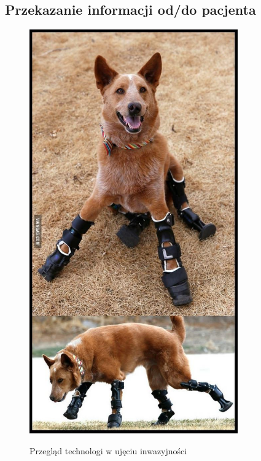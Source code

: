\documentclass[8pt]{beamer}
\begin{document}
		\subsection{Przekazanie informacji od/do pacjenta}	
		\begin{frame}
			\begin{center}
				\begin{figure}
					\includegraphics[width=0.8\textwidth]{graphics/dog.jpg}
					\label{graph:mems}	
					\caption{Przegląd technologi w ujęciu inwazyjności \cite{tenore}}
				\end{figure}
			\end{center}
		\end{frame}		
		
\end{document}

